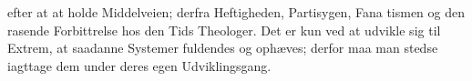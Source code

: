 \documentclass[12pt]{book}
\newcommand{\opage}[1]{\marginnote{\footnotesize\textit{[#1]}}}
\begin{document}
efter at at holde Middelveien; derfra Heftigheden, Partisygen, Fana\-%
\opage{85}%
tismen og den rasende Forbittrelse hos den Tids Theologer. Det er kun ved at
udvikle sig til Extrem, at saadanne Systemer fuldendes og ophæves; derfor maa
man stedse iagttage dem under deres egen Udviklingsgang.
\end{document}
